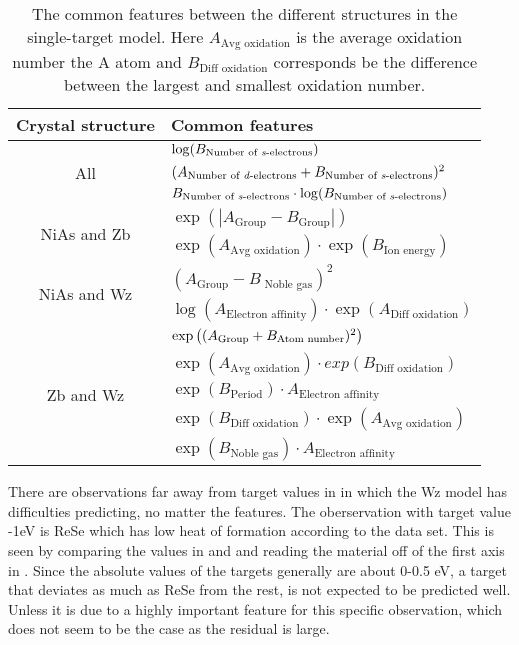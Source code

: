  \begin{table}[ht]
\centering
\begin{tabular}{c|p{10cm}}
\toprule
\textbf{Crystal structure} & \textbf{Common features} \\
   \midrule
   \hline
    \multirow{3}{*}{All} & $\log(B_{\text{Number of \textit{s}-electrons}})$ \\
    &  $(A_{\text{Number of \textit{d}-electrons}}+B_{\text{Number of \textit{s}-electrons}})^2$\\
    & $B_{\text{Number of \textit{s}-electrons}}\cdot\log(B_{\text{Number of \textit{s}-electrons}})$ \\\hline
    \multirow{2}{*}{NiAs and Zb}  
    & $\exp(|A_{\text{Group}} - B_{\text{Group}}|)$ \\
    
    & $\exp (A_{\text{Avg oxidation}}) \cdot \exp (B_{\text{Ion energy}}) $\\ \hline
    \multirow{2}{*}{NiAs and Wz}
    & $( A_{\text{Group}} - B_{\text{ Noble gas}})^2$\\
    & $ \log(A_{\text{Electron affinity}}) \cdot \exp(A_{\text{Diff oxidation}}) $\\ \hline
    \multirow{5}{*}{Zb and Wz} 
    & $\exp\qty( ( A_{\mathrm{Group}} + B_{\text{Atom number}})^2)$\\
    & $\exp(A_{\text{Avg oxidation}}) \cdot exp(B_{\text{Diff oxidation}})$\\
    & $\exp(B_{\mathrm{Period}}) \cdot A_{\text{Electron affinity}}$\\
    & $ \exp(B_{\text{Diff oxidation}}) \cdot \exp(A_{\text{Avg oxidation}}) $\\
    & $\exp(B_{\text{Noble gas}}) \cdot A_{\text{Electron affinity}}$\\
    \hline
\bottomrule
   
\end{tabular}
\caption[Common features for single-target model]{The common features between the different structures in the single-target model. Here $A_{\text{Avg oxidation}}$ is the average oxidation number the A atom and $B_{\text{Diff oxidation}}$ corresponds be the difference between the largest and smallest oxidation number.}
\label{tab:common_features}
\end{table}

 
There are observations far away from target values in  in which the Wz model has difficulties predicting, no matter the features.
The oberservation with target value -1eV is ReSe which has low heat of formation according to the data set. This is seen by comparing the values in  and  and reading the material off of the first axis in . Since the absolute values of the targets generally are about 0-0.5 eV, a target that deviates as much as ReSe from the rest, is not expected to be predicted well. Unless it is due to a highly important feature for this specific observation, which does not seem to be the case as the residual is large.


